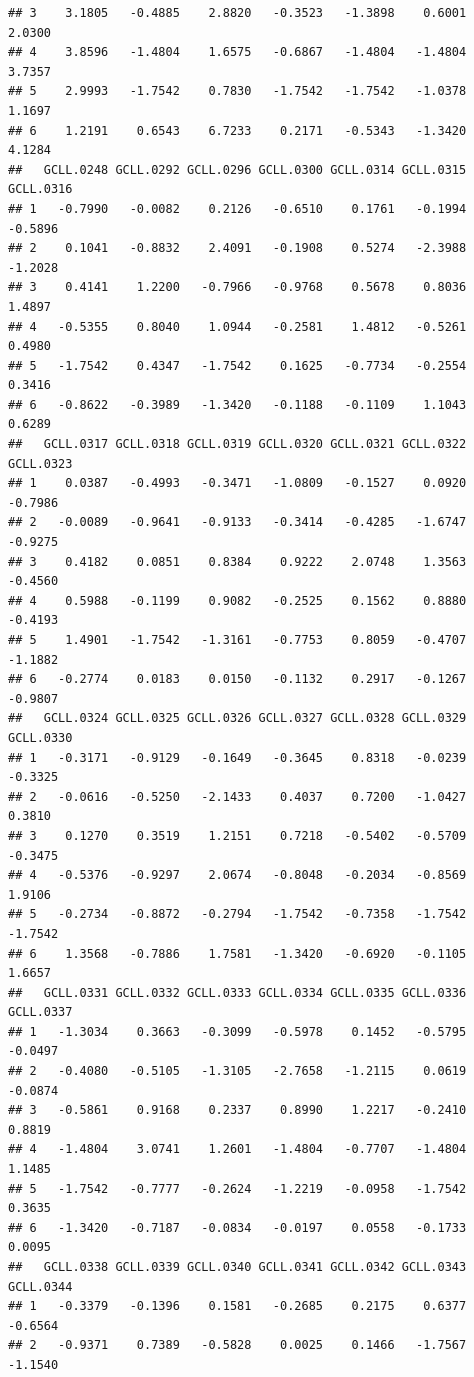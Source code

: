 \documentclass[
]{article}
\begin{document}
\begin{verbatim}
## 3    3.1805   -0.4885    2.8820   -0.3523   -1.3898    0.6001    2.0300
## 4    3.8596   -1.4804    1.6575   -0.6867   -1.4804   -1.4804    3.7357
## 5    2.9993   -1.7542    0.7830   -1.7542   -1.7542   -1.0378    1.1697
## 6    1.2191    0.6543    6.7233    0.2171   -0.5343   -1.3420    4.1284
##   GCLL.0248 GCLL.0292 GCLL.0296 GCLL.0300 GCLL.0314 GCLL.0315 GCLL.0316
## 1   -0.7990   -0.0082    0.2126   -0.6510    0.1761   -0.1994   -0.5896
## 2    0.1041   -0.8832    2.4091   -0.1908    0.5274   -2.3988   -1.2028
## 3    0.4141    1.2200   -0.7966   -0.9768    0.5678    0.8036    1.4897
## 4   -0.5355    0.8040    1.0944   -0.2581    1.4812   -0.5261    0.4980
## 5   -1.7542    0.4347   -1.7542    0.1625   -0.7734   -0.2554    0.3416
## 6   -0.8622   -0.3989   -1.3420   -0.1188   -0.1109    1.1043    0.6289
##   GCLL.0317 GCLL.0318 GCLL.0319 GCLL.0320 GCLL.0321 GCLL.0322 GCLL.0323
## 1    0.0387   -0.4993   -0.3471   -1.0809   -0.1527    0.0920   -0.7986
## 2   -0.0089   -0.9641   -0.9133   -0.3414   -0.4285   -1.6747   -0.9275
## 3    0.4182    0.0851    0.8384    0.9222    2.0748    1.3563   -0.4560
## 4    0.5988   -0.1199    0.9082   -0.2525    0.1562    0.8880   -0.4193
## 5    1.4901   -1.7542   -1.3161   -0.7753    0.8059   -0.4707   -1.1882
## 6   -0.2774    0.0183    0.0150   -0.1132    0.2917   -0.1267   -0.9807
##   GCLL.0324 GCLL.0325 GCLL.0326 GCLL.0327 GCLL.0328 GCLL.0329 GCLL.0330
## 1   -0.3171   -0.9129   -0.1649   -0.3645    0.8318   -0.0239   -0.3325
## 2   -0.0616   -0.5250   -2.1433    0.4037    0.7200   -1.0427    0.3810
## 3    0.1270    0.3519    1.2151    0.7218   -0.5402   -0.5709   -0.3475
## 4   -0.5376   -0.9297    2.0674   -0.8048   -0.2034   -0.8569    1.9106
## 5   -0.2734   -0.8872   -0.2794   -1.7542   -0.7358   -1.7542   -1.7542
## 6    1.3568   -0.7886    1.7581   -1.3420   -0.6920   -0.1105    1.6657
##   GCLL.0331 GCLL.0332 GCLL.0333 GCLL.0334 GCLL.0335 GCLL.0336 GCLL.0337
## 1   -1.3034    0.3663   -0.3099   -0.5978    0.1452   -0.5795   -0.0497
## 2   -0.4080   -0.5105   -1.3105   -2.7658   -1.2115    0.0619   -0.0874
## 3   -0.5861    0.9168    0.2337    0.8990    1.2217   -0.2410    0.8819
## 4   -1.4804    3.0741    1.2601   -1.4804   -0.7707   -1.4804    1.1485
## 5   -1.7542   -0.7777   -0.2624   -1.2219   -0.0958   -1.7542    0.3635
## 6   -1.3420   -0.7187   -0.0834   -0.0197    0.0558   -0.1733    0.0095
##   GCLL.0338 GCLL.0339 GCLL.0340 GCLL.0341 GCLL.0342 GCLL.0343 GCLL.0344
## 1   -0.3379   -0.1396    0.1581   -0.2685    0.2175    0.6377   -0.6564
## 2   -0.9371    0.7389   -0.5828    0.0025    0.1466   -1.7567   -1.1540

\end{verbatim}
\end{document}
